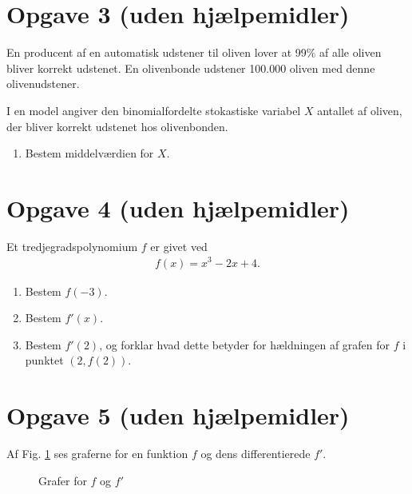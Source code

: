 \documentclass[12pt]{article}
\begin{document}
\section*{Opgave 3 (uden hjælpemidler)}

En producent af en automatisk udstener til oliven lover at 99$\%$ af alle oliven bliver korrekt udstenet. En olivenbonde udstener 100.000 oliven med denne olivenudstener. 

I en model angiver den binomialfordelte stokastiske variabel $X$ antallet af oliven, der bliver korrekt udstenet hos olivenbonden.
\begin{enumerate}[label=\roman*)]
\item Bestem middelværdien for $X$. 
\end{enumerate}

\section*{Opgave 4 (uden hjælpemidler)}

Et tredjegradspolynomium $f$ er givet ved
\begin{align*}
f(x) = x^3-2x+4.
\end{align*}
\begin{enumerate}[label=\roman*)]
\item Bestem $f(-3)$.
\item Bestem $f'(x)$.
\item Bestem $f'(2)$, og forklar hvad dette betyder for hældningen af grafen for $f$ i punktet $(2,f(2))$. 
\end{enumerate}


\section*{Opgave 5 (uden hjælpemidler)}
Af Fig. \ref{fig:topoly} ses graferne for en funktion $f$ og dens differentierede $f'$. 
\begin{figure}[H]
\centering
{}
\caption{Grafer for $f$ og $f'$}
\label{fig:topoly}
\end{figure}
\end{document}
